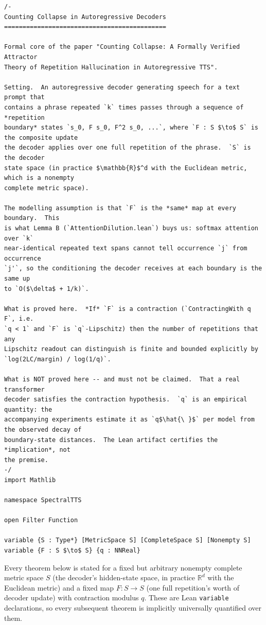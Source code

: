 \documentclass[11pt]{article}
\begin{document}
\begin{lstlisting}
/-
Counting Collapse in Autoregressive Decoders
============================================

Formal core of the paper "Counting Collapse: A Formally Verified Attractor
Theory of Repetition Hallucination in Autoregressive TTS".

Setting.  An autoregressive decoder generating speech for a text prompt that
contains a phrase repeated `k` times passes through a sequence of *repetition
boundary* states `s_0, F s_0, F^2 s_0, ...`, where `F : S $\to$ S` is the composite update
the decoder applies over one full repetition of the phrase.  `S` is the decoder
state space (in practice $\mathbb{R}$^d with the Euclidean metric, which is a nonempty
complete metric space).

The modelling assumption is that `F` is the *same* map at every boundary.  This
is what Lemma B (`AttentionDilution.lean`) buys us: softmax attention over `k`
near-identical repeated text spans cannot tell occurrence `j` from occurrence
`j'`, so the conditioning the decoder receives at each boundary is the same up
to `O($\delta$ + 1/k)`.

What is proved here.  *If* `F` is a contraction (`ContractingWith q F`, i.e.
`q < 1` and `F` is `q`-Lipschitz) then the number of repetitions that any
Lipschitz readout can distinguish is finite and bounded explicitly by
`log(2LC/margin) / log(1/q)`.

What is NOT proved here -- and must not be claimed.  That a real transformer
decoder satisfies the contraction hypothesis.  `q` is an empirical quantity: the
accompanying experiments estimate it as `q$\hat{\ }$` per model from the observed decay of
boundary-state distances.  The Lean artifact certifies the *implication*, not
the premise.
-/
import Mathlib

namespace SpectralTTS

open Filter Function

variable {S : Type*} [MetricSpace S] [CompleteSpace S] [Nonempty S]
variable {F : S $\to$ S} {q : NNReal}
\end{lstlisting}

Every theorem below is stated for a fixed but arbitrary nonempty complete
metric space $S$ (the decoder's hidden-state space, in practice
$\mathbb{R}^d$ with the Euclidean metric) and a fixed map $F : S \to S$ (one
full repetition's worth of decoder update) with contraction modulus $q$. These
are Lean \texttt{variable} declarations, so every subsequent theorem is
implicitly universally quantified over them.
\end{document}
